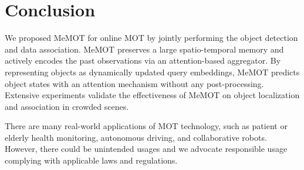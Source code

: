 \vspace{-1mm}
\section{Conclusion}
\label{sec:conclusion}
\vspace{-1mm}

We proposed MeMOT for online MOT by jointly performing the object detection and data association.
MeMOT preserves a large spatio-temporal memory and actively encodes the past observations via an attention-based aggregator. 
By representing objects as dynamically updated query embeddings, MeMOT predicts object states with an attention mechanism without any post-processing. Extensive experiments validate the effectiveness of MeMOT on object localization and association in crowded scenes.

There are many real-world applications of MOT technology, such as patient or elderly health monitoring, autonomous driving, and collaborative robots. However, there could be unintended usages and we advocate responsible usage complying with applicable laws and regulations.
